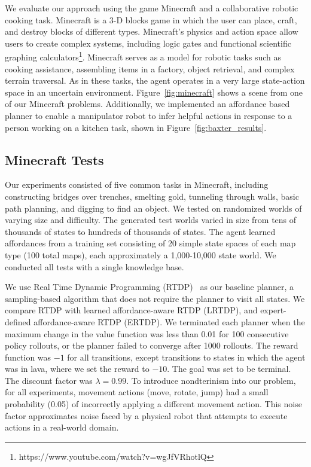 \documentclass[letterpaper]{article}
\begin{document}
We evaluate our approach using the game Minecraft and a collaborative
robotic cooking task.  Minecraft is a 3-D blocks game in which the
user can place, craft, and destroy blocks of different types.
Minecraft's physics and action space allow users to create complex
systems, including logic gates and functional scientific graphing
calculators\footnote{https://www.youtube.com/watch?v=wgJfVRhotlQ}.
Minecraft serves as a model for robotic tasks such as cooking
assistance, assembling items in a factory, object retrieval, and
complex terrain traversal.  As in these tasks, the agent operates in a
very large state-action space in an uncertain environment.
Figure~\ref{fig:minecraft} shows a scene from one of our Minecraft
problems.  Additionally, we implemented an affordance based planner to
enable a manipulator robot to infer helpful actions in response to a
person working on a kitchen task, shown in
Figure~\ref{fig:baxter_results}.

\subsection{Minecraft Tests}

Our experiments consisted of five common tasks in Minecraft, including
constructing bridges over trenches, smelting gold, tunneling through
walls, basic path planning, and digging to find an object.  We tested
on randomized worlds of varying size and difficulty. The generated
test worlds varied in size from tens of thousands of states to
hundreds of thousands of states.  The agent learned affordances from a
training set consisting of 20 simple state spaces of each map type
(100 total maps), each approximately a 1,000-10,000 state world. We
conducted all tests with a single knowledge base.

We use Real Time Dynamic Programming (RTDP)~\cite{barto95} as our
baseline planner, a sampling-based algorithm that does not require the
planner to visit all states. We compare RTDP with learned
affordance-aware RTDP (LRTDP), and expert-defined affordance-aware
RTDP (ERTDP). We terminated each planner when the maximum change in
the value function was less than 0.01 for 100 consecutive policy
rollouts, or the planner failed to converge after 1000 rollouts.  The
reward function was $-1$ for all transitions, except transitions to
states in which the agent was in lava, where we set the reward to
$-10$. The goal was set to be terminal. The discount factor was
$\lambda = 0.99$.  To introduce nondterinism into our problem, for all
experiments, movement actions (move, rotate, jump) had a small
probability (0.05) of incorrectly applying a different movement
action.  This noise factor approximates noise faced by a physical
robot that attempts to execute actions in a real-world domain.
\end{document}
